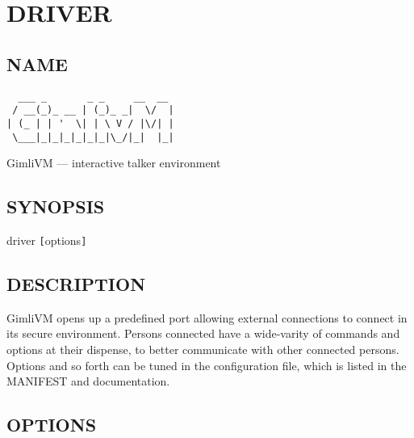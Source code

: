 
\section{DRIVER}%

\subsection*{NAME}\begin{verbatim}
  ___ _       _ _     __  __
 / __(_)_ __ | (_)_ _|  \/  |
| (_ | | '  \| | \ V / |\/| |
 \___|_|_|_|_|_|_|\_/|_|  |_|
\end{verbatim}

GimliVM --- interactive talker environment

\subsection*{SYNOPSIS}
driver {\tt [}options{\tt ]}

\subsection*{DESCRIPTION}
GimliVM opens up a predefined port allowing external 
connections to connect in its secure environment.  
Persons connected have a wide-varity of commands and 
options at their dispense, to better communicate with 
other connected persons.  Options and so forth can be 
tuned in the configuration file, which is listed in 
the MANIFEST and documentation.

\subsection*{OPTIONS}%

